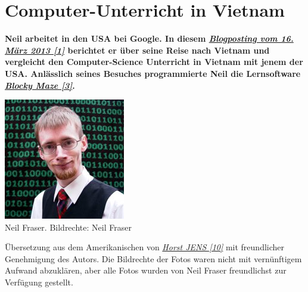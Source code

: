 \section*{Computer-Unterricht in Vietnam}
\hypertarget{vietnam}{}
\label{vietnam}

\textbf{Neil arbeitet in den USA bei Google. In diesem \href{http://neil.fraser.name/news/2013/03/16/}{\textit{Blogposting vom 16. M\"arz 2013 [1]}} berichtet er über seine Reise nach Vietnam und vergleicht den Computer-Science Unterricht in Vietnam mit jenem der USA. Anlässlich seines Besuches programmierte Neil die Lernsoftware \href{http://blockly-demo.appspot.com/static/apps/maze/en.html?level=1}{\textit{Blocky Maze [3]}}.} 

\begin{center}
\includegraphics[width=\linewidth]{vietnam/vietnam_neil_fraser.jpg} \\
\footnotesize{Neil Fraser. Bildrechte: Neil Fraser}
\end{center}

Übersetzung aus dem Amerikanischen von \href{http://spielend-programmieren.at}{\textit{Horst JENS [10]}}  mit freundlicher Genehmigung des Autors. Die Bildrechte der Fotos waren nicht mit vernünftigem Aufwand abzuklären, aber alle Fotos wurden von Neil Fraser freundlichst zur Verfügung gestellt. \\


